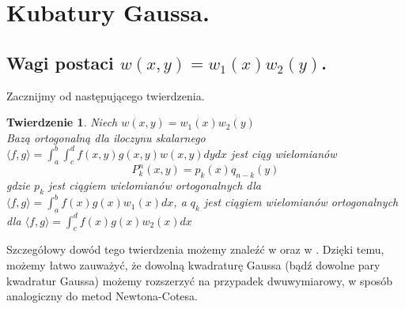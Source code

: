 \documentclass[10pt,wide]{mwart}
\newtheorem{tw}{Twierdzenie}
\theoremstyle{definition}
\begin{document}
\section{Kubatury Gaussa.}
\subsection{Wagi postaci \(w(x,y) = w_1(x)w_2(y)\).}
Zacznijmy od następującego twierdzenia.
\begin{tw}
  Niech \(w(x,y) = w_1(x)w_2(y)\) \\
  Bazą ortogonalną dla iloczynu skalarnego \(\langle f,g \rangle = \int_a^b\int_c^d f(x,y)g(x,y)w(x,y)dydx\) jest ciąg wielomianów
  \begin{equation*}
    P_k^n(x,y) = p_k(x)q_{n-k}(y)
  \end{equation*} gdzie \(p_k\) jest ciągiem wielomianów ortogonalnych dla \(\langle f,g \rangle = \int_a^b f(x)g(x)w_1(x) dx\),
  a \(q_k\) jest ciągiem wielomianów ortogonalnych dla \(\langle f,g \rangle = \int_c^d f(x)g(x)w_2(x)dx\)
\end{tw}
Szczegółowy dowód tego twierdzenia możemy znaleźć w \cite{PS} oraz w \cite{YX}.
Dzięki temu, możemy łatwo zauważyć, że dowolną kwadraturę Gaussa (bądź dowolne pary kwadratur Gaussa) możemy rozszerzyć na przypadek dwuwymiarowy, w sposób analogiczny do metod Newtona-Cotesa.
\end{document}

